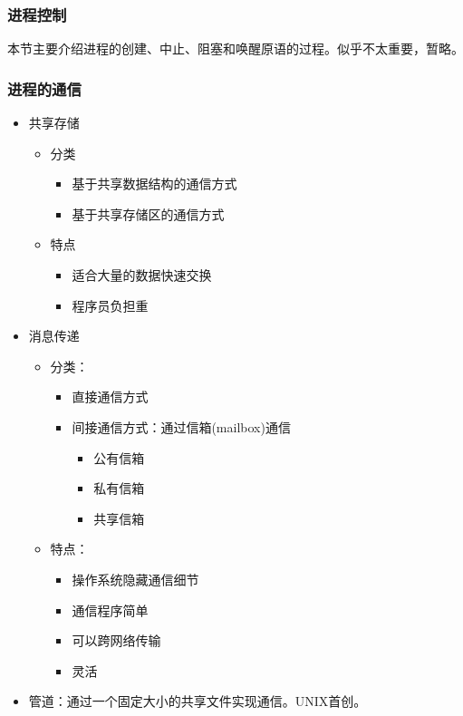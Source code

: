 \documentclass[12pt, a4paper, oneside]{ctexart}
\begin{document}
\subsubsection{进程控制}

本节主要介绍进程的创建、中止、阻塞和唤醒原语的过程。似乎不太重要，暂略。

\subsubsection{进程的通信}

\begin{itemize}
  \item 共享存储
  \begin{itemize}
    \item 分类
    \begin{itemize}
        \item 基于共享数据结构的通信方式
        \item 基于共享存储区的通信方式
    \end{itemize}
    \item 特点
    \begin{itemize}
        \item 适合大量的数据快速交换
        \item 程序员负担重
    \end{itemize}
  \end{itemize}
  \item 消息传递
  \begin{itemize}
    \item 分类：
    \begin{itemize}
        \item 直接通信方式
        \item 间接通信方式：通过信箱(mailbox)通信
        \begin{itemize}
            \item 公有信箱
            \item 私有信箱
            \item 共享信箱
        \end{itemize}
    \end{itemize}
    \item 特点：
    \begin{itemize}
        \item 操作系统隐藏通信细节
        \item 通信程序简单
        \item 可以跨网络传输
        \item 灵活
    \end{itemize}
  \end{itemize}
  \item 管道：通过一个固定大小的共享文件实现通信。UNIX首创。
\end{itemize}
\end{document}

